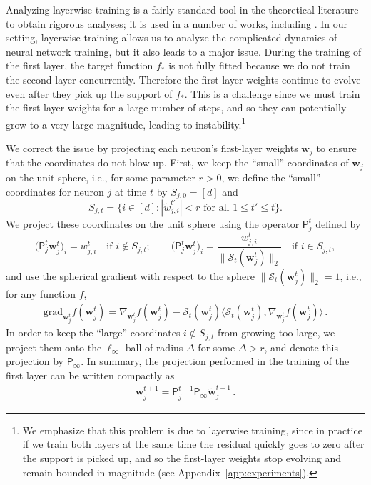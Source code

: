 \documentclass[11pt]{article}
\newcommand{\<}{\langle}
\renewcommand{\>}{\rangle}
\theoremstyle{definition}
\def\bw{{\boldsymbol w}}
\def\cS{{\mathcal S}}
\def\proj{{\mathsf P}}
\def\proj{{\mathsf P}}
\def\proj{{\mathsf P}}
\def\proj{{\mathsf P}}
\def\proj{{\mathsf P}}
\def\bw{{\boldsymbol w}}
\def\proj{{\mathsf P}}
\def\cS{{\mathcal S}}
\def\tbw{\widetilde \bw}
\def\grad{\text{grad}}
\def\tbw{\widetilde{\bw}}
\begin{document}
Analyzing layerwise training is a fairly standard tool in the theoretical literature to obtain rigorous analyses; it is used in a number of works, including \cite{daniely2020learning,barak2022hidden,damian2022neural,abbe2022merged}. In our setting, layerwise training allows us to analyze the complicated dynamics of neural network training, but it also leads to a major issue. During the training of the first layer, the target function $f_*$ is not fully fitted because we do not train the second layer concurrently. Therefore the first-layer weights continue to evolve even after they pick up the support of $f_*$. This is a challenge since we must train the first-layer weights for a large number of steps, and so they can potentially grow to a very large magnitude, leading to instability.\footnote{We emphasize that this problem is due to layerwise training, since in practice if we train both layers at the same time the residual quickly goes to zero after the support is picked up, and so the first-layer weights stop evolving and remain bounded in magnitude (see Appendix~\ref{app:experiments}).}

We correct the issue by projecting each neuron's first-layer weights $\bw_j$ to ensure that the coordinates do not blow up. First, we keep the ``small'' coordinates of $\bw_j$ on the unit sphere, i.e., for some parameter $r > 0$, we define the ``small'' coordinates for neuron $j$ at time $t$ by $S_{j,0} = [d]$ and 
$$S_{j,t} = \{i \in [d] : |\tilde{w}_{j,i}^{t'}| < r \mbox{ for all } 1 \leq t' \leq t\}.$$ We project these coordinates on the unit sphere using the operator $\proj^{t}_{j}$ defined by
\begin{equation}\label{eq:projection_on_St}
\big( \proj^{t}_{j} \bw_j^t  \big)_i =  w_{j,i}^t \quad \text{if $i \not\in S_{j,t}$}; \qquad \big( \proj^{t}_{j} \bw_j^t  \big)_i = \frac{w_{j,i}^t}{\| \cS_t (\bw_j^t) \|_2 } \quad \text{if $i \in S_{j,t}$},
\end{equation}
and use the spherical gradient with respect to the sphere $\| \cS_t (\bw_j^t) \|_2 = 1$, i.e., for any function $f$,
\begin{align}\label{eq:first-layer-sphere-grad}
\grad_{\bw_j^t} f(\bw_j^t) = \nabla_{\bw_j^t} f(\bw_j^t) - \cS_t (\bw_j^t) \< \cS_t (\bw_j^t) , \nabla_{\bw_j^t} f(\bw_j^t) \> \, .
\end{align}
In order to keep the ``large'' coordinates $i \not\in S_{j,t}$ from growing too large, we project them onto the $\ell_\infty$ ball of radius $\Delta$ for some $\Delta > r$, and denote this projection by $\proj_{\infty}$. In summary, the projection performed in the training of the first layer can be written compactly as
\begin{align}\label{eq:first-layer-projection}
\bw_j^{t+1} =   \proj^{t+1}_{j} \proj_{\infty} \tbw_j^{t+1}\,.
\end{align}
\end{document}
